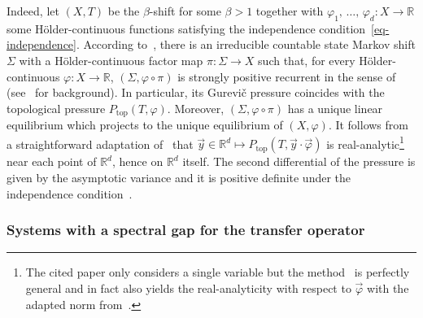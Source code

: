\documentclass[10pt]{amsart}
\theoremstyle{definition}\newtheorem{defi}[theo]{Definition}\newtheorem{rema}[theo]{Remark}\newtheorem{exam}[theo]{Example}\newtheorem{exem}[theo]{Example}\newtheorem{nota}[theo]{Notation}
\theoremstyle{plain}
\theoremstyle{plain}
\renewcommand\top{{\mathrm{top}}}
\newcommand{\pot}{\varphi}
\newcounter{In}
\newcommand*\8{\infty}
\newcommand\RR{\mathbb{R}}
\begin{document}
Indeed, let $(X,T)$ be the $\beta$-shift for some $\beta>1$ together with $ \varphi_1,\,\dots,\,\varphi_d:X\to\RR$ some H\"older-continuous functions satisfying the independence condition~\eqref{eq-independence}. According to~\cite[Theorem~1.2 and Example~1.5]{Climenhaga-2018-towers}, there is an irreducible countable state Markov shift $\Sigma$ with a H\"older-continuous factor map $\pi:\Sigma\to X$ such that, for every H\"older-continuous $\varphi:X\to\RR$, $(\Sigma, \varphi\circ\pi)$ is strongly positive recurrent in the sense of~\cite{Sarig-2001-PhaseTransitions} (see~\cite{Sarig-2015-thermo} for background). In particular, its Gurevič pressure coincides with the topological pressure $P_\top(T, \varphi)$. Moreover, $(\Sigma,\varphi\circ\pi)$ has a unique linear equilibrium which projects to the unique equilibrium of $(X, \varphi)$. It follows from a straightforward adaptation of~\cite{Cyr-Sarig-2009} that $\vec y\in\RR^d\mapsto P_\top(T,\vec y\cdot\vec\pot)$ is real-analytic\footnote{The cited paper only considers a single variable but the method~\cite[end of Section~3.1]{Cyr-Sarig-2009} is perfectly general and in fact also yields the real-analyticity with respect to $\vec\pot$ with the adapted norm from~\cite{Cyr-Sarig-2009}.} near each point of $\RR^d$, hence on $\RR^d$ itself. The second differential of the pressure is given by the asymptotic variance and it is positive definite under the independence condition~\cite[Theorems~6.4~and~6.5]{Sarig-2015-thermo}.



\subsubsection{Systems with a spectral gap for the transfer operator}
\end{document}
